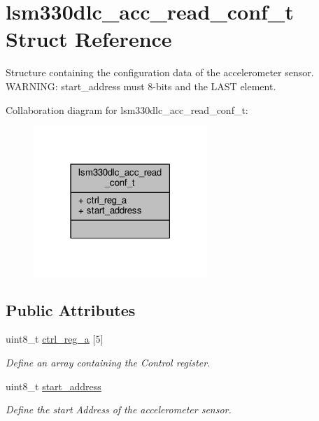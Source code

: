 \hypertarget{structlsm330dlc__acc__read__conf__t}{\section{lsm330dlc\+\_\+acc\+\_\+read\+\_\+conf\+\_\+t Struct Reference}
\label{structlsm330dlc__acc__read__conf__t}
}


Structure containing the configuration data of the accelerometer sensor. W\+A\+R\+N\+I\+N\+G\+: start\+\_\+address must 8-\/bits and the L\+A\+S\+T element.  




Collaboration diagram for lsm330dlc\+\_\+acc\+\_\+read\+\_\+conf\+\_\+t\+:
\nopagebreak
\begin{figure}[H]
\begin{center}
\leavevmode
\includegraphics[width=186pt]{structlsm330dlc__acc__read__conf__t__coll__graph}
\end{center}
\end{figure}
\subsection*{Public Attributes}
\begin{DoxyCompactItemize}
\item 
\hypertarget{structlsm330dlc__acc__read__conf__t_aa5b6faf01ba0f26026363315f2b37005}{uint8\+\_\+t \hyperlink{structlsm330dlc__acc__read__conf__t_aa5b6faf01ba0f26026363315f2b37005}{ctrl\+\_\+reg\+\_\+a} \mbox{[}5\mbox{]}}\label{structlsm330dlc__acc__read__conf__t_aa5b6faf01ba0f26026363315f2b37005}

\begin{DoxyCompactList}\small\item\em Define an array containing the Control register. \end{DoxyCompactList}\item 
\hypertarget{structlsm330dlc__acc__read__conf__t_a35db0f4e85f5f592f019894efcba5a6a}{uint8\+\_\+t \hyperlink{structlsm330dlc__acc__read__conf__t_a35db0f4e85f5f592f019894efcba5a6a}{start\+\_\+address}}\label{structlsm330dlc__acc__read__conf__t_a35db0f4e85f5f592f019894efcba5a6a}

\begin{DoxyCompactList}\small\item\em Define the start Address of the accelerometer sensor. \end{DoxyCompactList}\end{DoxyCompactItemize}


